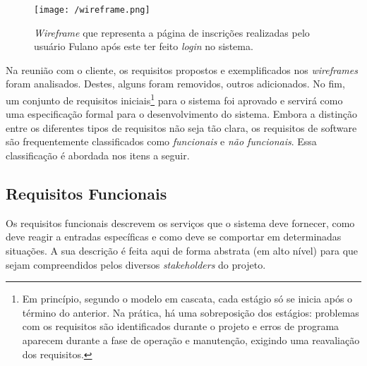 \documentclass[
  10.5pt,				  %
	openright,			%
	twoside,			  %
  a5paper,
  chapter=TITLE,	%
	section=TITLE,	%
  hyphens,        %
	english,        %
	brazil          %
]{abntex2}
\begin{document}
\begin{figure}[!ht]
  \caption{\label{fig:wireframe} \emph{Wireframe} que representa a página de inscrições realizadas pelo usuário Fulano após este ter feito \emph{login} no sistema. }
  \begin{center}
    \texttt{[image: /wireframe.png]}
  \end{center}
\end{figure}

Na reunião com o cliente, os requisitos propostos e exemplificados nos \emph{wireframes} foram analisados. Destes, alguns foram removidos, outros adicionados. No fim, um conjunto de requisitos iniciais\footnote{Em princípio, segundo o modelo em cascata, cada estágio só se inicia após o término do anterior. Na prática, há uma sobreposição dos estágios: problemas com os requisitos são identificados durante o projeto e erros de programa aparecem durante a fase de operação e manutenção, exigindo uma reavaliação dos requisitos.} para o sistema foi aprovado e servirá como uma especificação formal para o desenvolvimento do sistema. Embora a distinção entre os diferentes tipos de requisitos não seja tão clara, os requisitos de software são frequentemente classificados como \emph{funcionais} e \emph{não funcionais}. Essa classificação é abordada nos itens a seguir.

\subsection{Requisitos Funcionais}\label{sec:requisitos_funcionais}

Os requisitos funcionais descrevem os serviços que o sistema deve fornecer, como deve reagir a entradas específicas e como deve se comportar em determinadas situações. A sua descrição é feita aqui de forma abstrata (em alto nível) para que sejam compreendidos pelos diversos \emph{stakeholders} do projeto.
\end{document}
